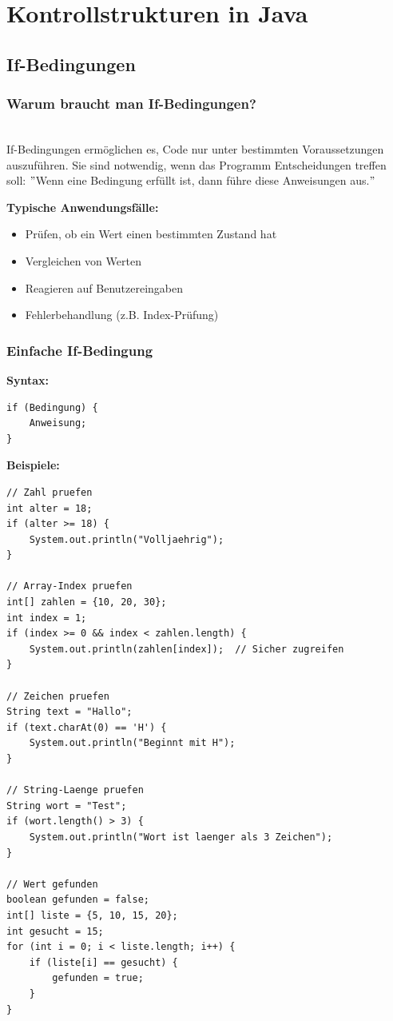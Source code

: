 \begingroup
\let\cleardoublepage\relax


\chapter*{Kontrollstrukturen in Java}
\label{ch:kontrollstrukturen-in-java}
\endgroup


\section*{If-Bedingungen}

\subsection*{Warum braucht man If-Bedingungen?}\\
If-Bedingungen ermöglichen es, Code nur unter bestimmten Voraussetzungen auszuführen.
Sie sind notwendig, wenn das Programm Entscheidungen treffen soll: \("\)Wenn eine Bedingung erfüllt ist, dann führe diese Anweisungen aus.\("\)

\textbf{Typische Anwendungsfälle:}
\begin{itemize}
	\item Prüfen, ob ein Wert einen bestimmten Zustand hat
	\item Vergleichen von Werten
	\item Reagieren auf Benutzereingaben
	\item Fehlerbehandlung (z.B. Index-Prüfung)
\end{itemize}

\newpage


\subsection*{Einfache If-Bedingung}

\textbf{Syntax:}
\begin{lstlisting}
if (Bedingung) {
    Anweisung;
}
\end{lstlisting}

\textbf{Beispiele:}
\begin{lstlisting}
// Zahl pruefen
int alter = 18;
if (alter >= 18) {
    System.out.println("Volljaehrig");
}

// Array-Index pruefen
int[] zahlen = {10, 20, 30};
int index = 1;
if (index >= 0 && index < zahlen.length) {
    System.out.println(zahlen[index]);  // Sicher zugreifen
}

// Zeichen pruefen
String text = "Hallo";
if (text.charAt(0) == 'H') {
    System.out.println("Beginnt mit H");
}

// String-Laenge pruefen
String wort = "Test";
if (wort.length() > 3) {
    System.out.println("Wort ist laenger als 3 Zeichen");
}

// Wert gefunden
boolean gefunden = false;
int[] liste = {5, 10, 15, 20};
int gesucht = 15;
for (int i = 0; i < liste.length; i++) {
    if (liste[i] == gesucht) {
        gefunden = true;
    }
}
\end{lstlisting}

